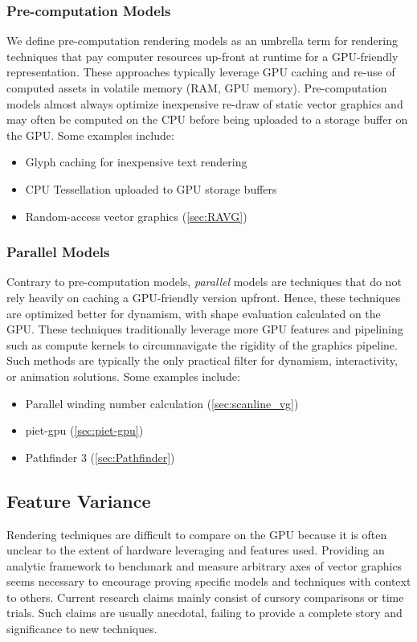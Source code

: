 \subsubsection{Pre-computation Models}\label{sec:precomp_models}
We define pre-computation rendering models as an umbrella term for rendering techniques that pay computer resources up-front at runtime for a GPU-friendly representation. These approaches typically leverage GPU caching and re-use of computed assets in volatile memory (RAM, GPU memory). Pre-computation models almost always optimize inexpensive re-draw of static vector graphics and may often be computed on the CPU before being uploaded to a storage buffer on the GPU. Some examples include:
\begin{itemize}
    \item Glyph caching for inexpensive text rendering
    \item CPU Tessellation uploaded to GPU storage buffers
    \item Random-access vector graphics (\cref{sec:RAVG})
\end{itemize}

\subsubsection{Parallel Models}\label{sec:parallel_models}

Contrary to pre-computation models, \textit{parallel} models are techniques that do not rely heavily on caching a GPU-friendly version upfront. Hence, these techniques are optimized better for dynamism, with shape evaluation calculated on the GPU. These techniques traditionally leverage more GPU features and pipelining such as compute kernels to circumnavigate the rigidity of the graphics pipeline. Such methods are typically the only practical filter for dynamism, interactivity, or animation solutions. Some examples include:
\begin{itemize}
    \item Parallel winding number calculation (\cref{sec:scanline_vg})
    \item piet-gpu (\cref{sec:piet-gpu})
    \item Pathfinder 3 (\cref{sec:Pathfinder})
\end{itemize}

\subsection{Feature Variance}
Rendering techniques are difficult to compare on the GPU because it is often unclear to the extent of hardware leveraging and features used. Providing an analytic framework to benchmark and measure arbitrary axes of vector graphics seems necessary to encourage proving specific models and techniques with context to others. Current research claims mainly consist of cursory comparisons or time trials. Such claims are usually anecdotal, failing to provide a complete story and significance to new techniques.\medskip

